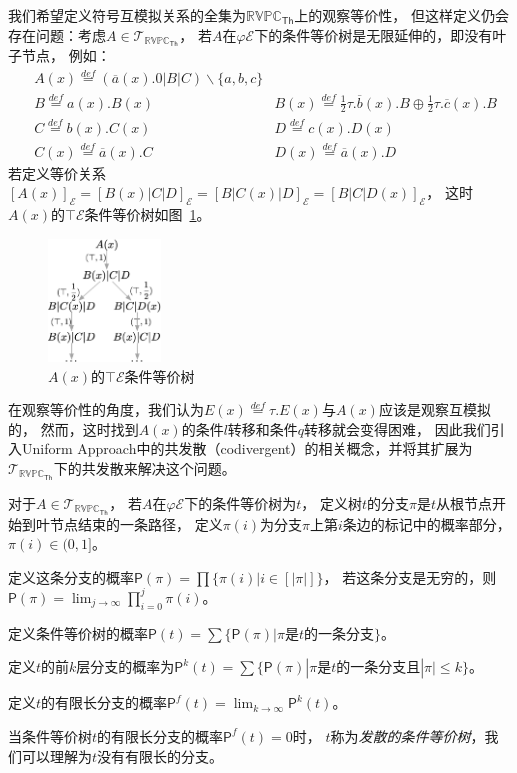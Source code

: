 我们希望定义符号互模拟关系的全集为$\mathbb{RVPC}_{\mathsf{Th}}$上的观察等价性，
但这样定义仍会存在问题：考虑$A\in\mathcal{T}_{\mathbb{RVPC}_{\mathsf{Th}}}$，
若$A$在$\varphi\mathcal{E}$下的条件等价树是无限延伸的，即没有叶子节点，
例如：
\begin{align*}
   &A(x) \stackrel{def}{=} (\overline{a}(x).0|B|C)\backslash \{a,b,c\} &\\
   &B\stackrel{def}{=}a(x).B(x)
   &B(x)\stackrel{def}{=} \frac{1}{2}\tau.\overline{b}(x).B\oplus \frac{1}{2}\tau.\overline{c}(x).B\\
   &C\stackrel{def}{=} b(x).C(x)
   &D\stackrel{def}{=} c(x).D(x)\\
   &C(x)\stackrel{def}{=} \overline{a}(x).C
   &D(x)\stackrel{def}{=} \overline{a}(x).D
\end{align*}
若定义等价关系$[A(x)]_{\mathcal{E}}=[B(x)|C|D]_{\mathcal{E}}=[B|C(x)|D]_{\mathcal{E}}=[B|C|D(x)]_{\mathcal{E}}$，
这时$A(x)$的$\top \mathcal{E}$条件等价树如图~\ref{fig:divergent}。
\begin{figure}[!htbp]
   \small
   \centering
   \includegraphics[width=3cm]{../figures/codivergent.png}
   \caption[]{$A(x)$的$\top \mathcal{E}$条件等价树} 
   \label{fig:divergent}
\end{figure}
在观察等价性的角度，我们认为$E(x)\stackrel{def}{=}\tau.E(x)$与$A(x)$应该是观察互模拟的，
然而，这时找到$A(x)$的条件$l$转移和条件$q$转移就会变得困难，
因此我们引入Uniform Approach中的共发散（codivergent）\cite{Fu_UniformApproach}的相关概念，并将其扩展为$\mathcal{T}_{\mathbb{RVPC}_{\mathsf{Th}}}$下的共发散来解决这个问题。

\begin{definition}[发散]\label{def:divergent}
   对于$A\in\mathcal{T}_{\mathbb{RVPC}_{\mathsf{Th}}}$，
   若$A$在$\varphi\mathcal{E}$下的条件等价树为$t$，
   定义树$t$的分支$\pi$是$t$从根节点开始到叶节点结束的一条路径，
   定义$\pi(i)$为分支$\pi$上第$i$条边的标记中的概率部分，$\pi(i)\in(0,1]$。

   定义这条分支的概率$\mathsf{P}(\pi)=\prod\{\pi(i)|i\in [|\pi|]\}$，
   若这条分支是无穷的，则$\mathsf{P}(\pi)=\lim_{j\rightarrow \infty}\prod_{i=0}^{j}\pi(i)$。

   定义条件等价树的概率$\mathsf{P}(t)=\sum\{\mathsf{P}(\pi)|\pi\textrm{是}t\textrm{的一条分支}\}$。
   
   定义$t$的前$k$层分支的概率为$\mathsf{P}^k(t)=\sum \{\mathsf{P}(\pi)|\pi\textrm{是}t\textrm{的一条分支且}|\pi|\leq k\}$。

   定义$t$的有限长分支的概率$\mathsf{P}^f(t)=\lim_{k\rightarrow\infty}\mathsf{P}^k(t)$。

   当条件等价树$t$的有限长分支的概率$\mathsf{P}^f(t)=0$时，
   $t$称为\textit{发散的条件等价树}，我们可以理解为$t$没有有限长的分支。
\end{definition}

